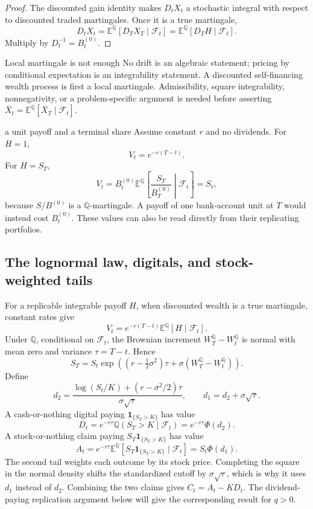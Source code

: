 \documentclass[10pt]{article}
\newcommand{\E}{\mathbb E}
\newcommand{\Q}{\mathbb Q}
\newcommand{\1}{\mathbf 1}
\newcommand{\cF}{\mathcal F}
\theoremstyle{definition}
\begin{document}
\begin{proof}
The discounted gain identity makes \(D_tX_t\) a stochastic integral with
respect to discounted traded martingales. Once it is a true martingale,
\[
D_tX_t=\E^\Q[D_TX_T\mid\cF_t]
=\E^\Q[D_TH\mid\cF_t].
\]
Multiply by \(D_t^{-1}=B_t^{(0)}\).
\end{proof}

\begin{warningbox}{Local martingale is not enough}
No drift is an algebraic statement; pricing by conditional expectation is an
integrability statement. A discounted self-financing wealth process is first
a local martingale. Admissibility, square integrability, nonnegativity, or a
problem-specific argument is needed before asserting
\(\bar X_t=\E^\Q[\bar X_T\mid\cF_t]\).
\end{warningbox}

\begin{boardexample}{a unit payoff and a terminal share}
Assume constant \(r\) and no dividends. For \(H=1\),
\[
V_t=e^{-r(T-t)}.
\]
For \(H=S_T\),
\[
V_t=B_t^{(0)}
\E^\Q\left[\frac{S_T}{B_T^{(0)}}\middle|\cF_t\right]
=S_t,
\]
because \(S/B^{(0)}\) is a \(\Q\)-martingale. A payoff of one bank-account
unit at \(T\) would instead cost \(B_t^{(0)}\). These values can also be
read directly from their replicating portfolios.
\end{boardexample}



\subsection{The lognormal law, digitals, and stock-weighted tails}

For a replicable integrable payoff \(H\), when discounted wealth is a
true martingale, constant rates give
\[
\boxed{V_t=e^{-r(T-t)}\E^\Q[H\mid\cF_t].}
\]
Under \(\Q\), conditional on \(\cF_t\), the Brownian increment
\(W_T^\Q-W_t^\Q\) is normal with mean zero and variance
\(\tau=T-t\). Hence
\[
S_T=S_t\exp\!\left((r-\tfrac12\sigma^2)\tau
+\sigma(W_T^\Q-W_t^\Q)\right).
\]
Define
\[
d_2=\frac{\log(S_t/K)+(r-\sigma^2/2)\tau}{\sigma\sqrt\tau},
\qquad d_1=d_2+\sigma\sqrt\tau.
\]
A cash-or-nothing digital paying
\(\1_{\{S_T>K\}}\) has value
\[
\boxed{D_t=e^{-r\tau}\Q(S_T>K\mid\cF_t)
=e^{-r\tau}\Phi(d_2).}
\]
A stock-or-nothing claim paying \(S_T\1_{\{S_T>K\}}\) has value
\[
\boxed{A_t=e^{-r\tau}\E^\Q[S_T\1_{\{S_T>K\}}\mid\cF_t]
=S_t\Phi(d_1).}
\]
The second tail weights each outcome by its stock price. Completing the
square in the normal density shifts the standardized cutoff by
\(\sigma\sqrt\tau\), which is why it uses \(d_1\) instead of \(d_2\).
Combining the two claims gives \(C_t=A_t-KD_t\). The dividend-paying
replication argument below will give the corresponding result for \(q>0\).
\end{document}
